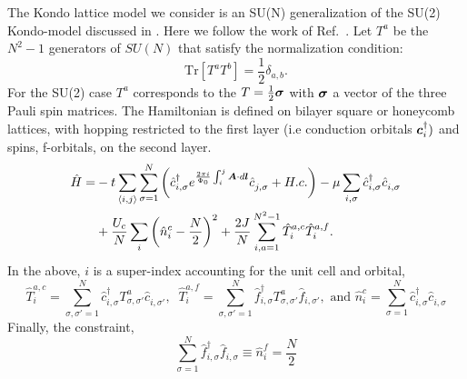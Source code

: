 \label{sec:kondo}

The Kondo lattice model we consider is an SU(N) generalization of the SU(2) Kondo-model discussed in \cite{Capponi00,Assaad99a}.
Here we follow the work of  Ref.~\cite{Raczkowski20}.
Let $T^{a}$ be the $N^2 -1  $ generators of $SU(N)$ that satisfy the normalization condition: 
\begin{equation}
	\text{Tr}  \left[ T^{a} T^{b} \right]   = \frac{1}{2}\delta_{a,b}.
\label{Normalization_condition.eq}
\end{equation}
For the SU(2) case $T^{a}$  corresponds to the $T  = \frac{1}{2} \boldsymbol{\sigma}$ with $\boldsymbol{\sigma}$   a vector of the three Pauli spin matrices.      The   Hamiltonian is defined on bilayer  square or honeycomb lattices, with  hopping restricted to the  first layer  (i.e  conduction orbitals $\boldsymbol{c}^{\dagger}_{i}  )$   and  spins, f-orbitals, on the second layer. 
\begin{align}
	\hat{H} =&  - t  \sum_{\langle i,j \rangle}    \sum_{\sigma=1}^{N}  \left(  \hat{c}^{\dagger}_{i,\sigma}  e^{\frac{2\pi i}{\Phi_0}  \int_{i}^{j} \ve{A}\cdot d \ve{l}}\hat{c}^{\phantom\dagger}_{j,\sigma}   + H.c.  \right)  - \mu \sum_{i,\sigma} \hat{c}^{\dagger}_{i,\sigma}  \hat{c}^{\phantom\dagger}_{i,\sigma}\nonumber \\ 
	&+    \frac{U_c}{N}  \sum_{i}   \left( \hat{n}^c_i -  \frac{N}{2} \right)^2  
         +  \frac{2 J}{N} \sum_{i, a=1  }^{N^2 -1}  \hat{T}^{a,c}_{i}  \hat{T}^{a,f}_{i}. 
\label{Kondo_SUN_Ham.eq}
\end{align}
In the above, $i$ is a super-index accounting for the unit cell and orbital,
\begin{equation}
	 \hat{T}^{a,c}_{i}   =   \sum_{\sigma,\sigma'=1}^{N} \hat{c}^{\dagger}_{i,\sigma}T^{a}_{\sigma,\sigma'}  \hat{c}^{\phantom\dagger}_{i,\sigma'}, \; \; 
	  \hat{T}^{a,f}_{i}   = \sum_{\sigma,\sigma'=1}^{N} \hat{f}^{\dagger}_{i,\sigma} T^{a}_{\sigma,\sigma'}  \hat{f}^{\phantom\dagger}_{i,\sigma'},  
	  \text{   and  }   \hat{n}^c_i  = \sum_{\sigma=1}^{N} \hat{c}_{i,\sigma}^{\dagger} \hat{c}_{i,\sigma}^{\phantom\dagger} 
\end{equation}
Finally, the constraint, 
\begin{equation}
   \sum_{\sigma=1}^{N}  \hat{f}^{\dagger}_{i,\sigma}   \hat{f}^{\phantom\dagger}_{i,\sigma}  \equiv  \hat{n}^{f}_i = \frac{N}{2}
\end{equation}
